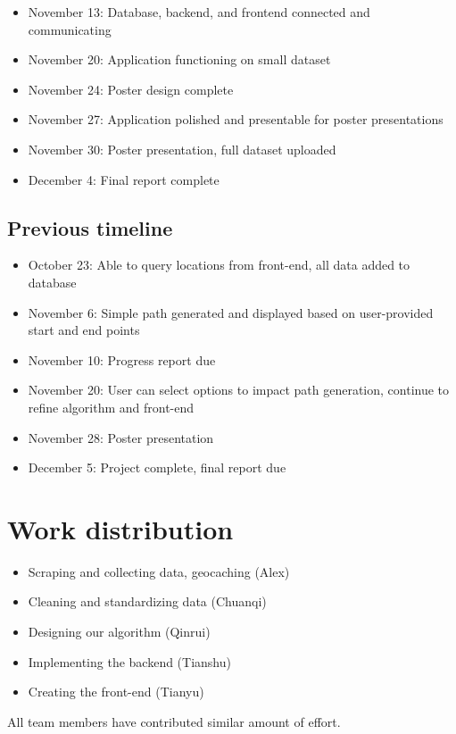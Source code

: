 \documentclass[sigconf]{acmart}
\begin{document}
\begin{itemize}
	\item November 13: Database, backend, and frontend connected and communicating
	\item November 20: Application functioning on small dataset
	\item November 24: Poster design complete
	\item November 27: Application polished and presentable for poster presentations
	\item November 30: Poster presentation, full dataset uploaded
	\item December 4: Final report complete
\end{itemize}

\subsection{Previous timeline}
\begin{itemize}
	\item October 23: Able to query locations from front-end, all data added to database
	\item November 6: Simple path generated and displayed based on user-provided start and end points
	\item November 10: Progress report due
	\item November 20: User can select options to impact path generation, continue to refine algorithm and front-end
	\item November 28: Poster presentation
	\item December 5: Project complete, final report due
\end{itemize}

\section{Work distribution}

\begin{itemize}
	\item Scraping and collecting data, geocaching (Alex)
	\item Cleaning and standardizing data (Chuanqi)
	\item Designing our algorithm (Qinrui)
	\item Implementing the backend (Tianshu)
	\item Creating the front-end (Tianyu)
\end{itemize}

All team members have contributed similar amount of effort.
\end{document}

